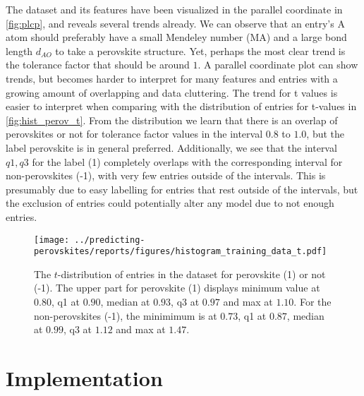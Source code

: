 \noindent The dataset and its features have been visualized in the parallel coordinate \cite{Inselberg1985} in \autoref{fig:plcp}, and reveals several trends already. We can observe that an entry's A atom should preferably have a small Mendeley number (MA) and a large bond length $d_{AO}$ to take a perovskite structure. Yet, perhaps the most clear trend is the tolerance factor that should be around $1$. A parallel coordinate plot can show trends, but becomes harder to interpret for many features and entries with a growing amount of overlapping and data cluttering. The trend for t values is easier to interpret when comparing with the distribution of entries for t-values in \autoref{fig:hist_perov_t}. From the distribution we learn that there is an overlap of perovskites or not for tolerance factor values in the interval $0.8$ to $1.0$, but the label perovskite is in general preferred. Additionally, we see that the interval ${q1,q3}$ for the label (1) completely overlaps with the corresponding interval for non-perovskites (-1), with very few entries outside of the intervals. This is presumably due to easy labelling for entries that rest outside of the intervals, but the exclusion of entries could potentially alter any model due to not enough entries. %

\begin{figure}[ht!]
  \centering
  \texttt{[image: ../predicting-perovskites/reports/figures/histogram\_training\_data\_t.pdf]}
  \vspace*{-130mm}
  \caption{The $t$-distribution of entries in the dataset for perovskite (1) or not (-1). The upper part for perovskite (1) displays minimum value at $0.80$, q1 at $0.90$, median at $0.93$, q3 at $0.97$ and max at $1.10$. For the non-perovskites (-1), the minimimum is at $0.73$, q1 at $0.87$, median at $0.99$, q3 at $1.12$ and max at $1.47$.}
  \label{fig:hist_perov_t}
\end{figure}

\section{Implementation}



